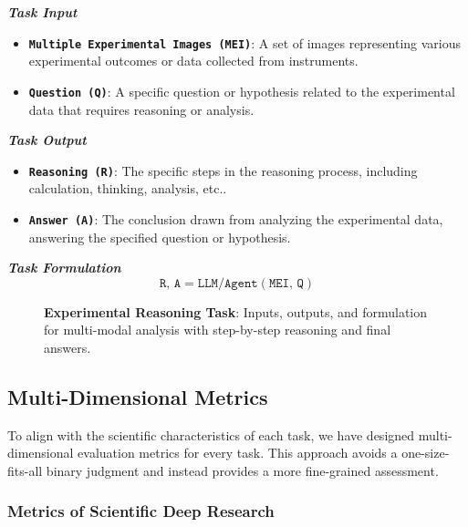 \begin{tcolorbox}[
    breakable,
    title=Task Definition of Experimental Reasoning,
    colback=LighterGray,
    colframe=DeepPurple,
    colbacktitle=DeepPurple,
    coltitle=White
]
\textbf{\emph{\textcolor{DeepPurple}{Task Input}}}
\begin{itemize}
    \item \texttt{\textbf{Multiple Experimental Images (MEI)}}: A set of images representing various experimental outcomes or data collected from instruments.
    \item \texttt{\textbf{Question (Q)}}: A specific question or hypothesis related to the experimental data that requires reasoning or analysis.
\end{itemize}

\textbf{\emph{\textcolor{DeepPurple}{Task Output}}}
\begin{itemize}
    \item \texttt{\textbf{Reasoning (R)}}: The specific steps in the reasoning process, including calculation, thinking, analysis, etc..
    \item \texttt{\textbf{Answer (A)}}: The conclusion drawn from analyzing the experimental data, answering the specified question or hypothesis.
\end{itemize}

\textbf{\emph{\textcolor{DeepPurple}{Task Formulation}}}
\[
\texttt{R, A} = \texttt{LLM/Agent}(\texttt{MEI, Q})
\]
\end{tcolorbox}

\begin{figure}[ht]
    \vspace{0.01cm}
    \caption{\textbf{Experimental Reasoning Task}: Inputs, outputs, and formulation for multi-modal analysis with step-by-step reasoning and final answers.}
    \label{fig:Task Definition of Experimental Reasoning}
\end{figure}


\subsection{Multi-Dimensional Metrics}
\label{sec:Metrics}

To align with the scientific characteristics of each task, we have designed multi-dimensional evaluation metrics for every task. This approach avoids a one-size-fits-all binary judgment and instead provides a more fine-grained assessment.

\subsubsection{Metrics of Scientific Deep Research}

